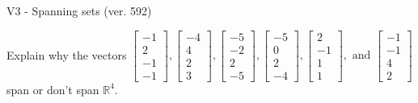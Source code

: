 \begin{exercise}
  \begin{exerciseTitle}V3 - Spanning sets (ver. 592)\end{exerciseTitle}
  \begin{exerciseStatement}
    Explain why the vectors \(\left[\begin{array}{r}
-1 \\
2 \\
-1 \\
-1
\end{array}\right] , \left[\begin{array}{r}
-4 \\
4 \\
2 \\
3
\end{array}\right] , \left[\begin{array}{r}
-5 \\
-2 \\
2 \\
-5
\end{array}\right] , \left[\begin{array}{r}
-5 \\
0 \\
2 \\
-4
\end{array}\right] , \left[\begin{array}{r}
2 \\
-1 \\
1 \\
1
\end{array}\right] , \text{ and } \left[\begin{array}{r}
-1 \\
-1 \\
4 \\
2
\end{array}\right]\) span or don't span \(\mathbb{R}^4\). 
	



\end{exerciseStatement}
\end{exercise}
